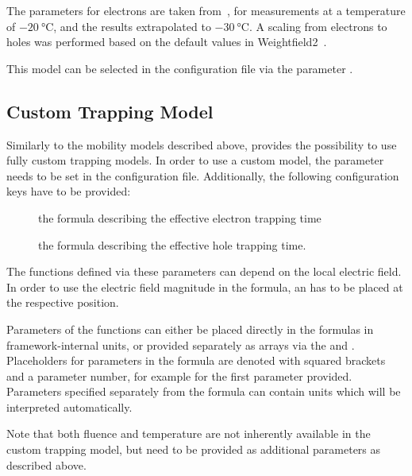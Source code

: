 The parameters for electrons are taken from~\cite{Mandic}, for measurements at a temperature of $\SI{-20}{\celsius}$, and the results extrapolated to $\SI{-30}{\celsius}$.
A scaling from electrons to holes was performed based on the default values in Weightfield2~\cite{Weightfield2}.

This model can be selected in the configuration file via the parameter .

\subsection{Custom Trapping Model}

Similarly to the mobility models described above, \apsq provides the possibility to use fully custom trapping models.
In order to use a custom model, the parameter  needs to be set in the configuration file.
Additionally, the following configuration keys have to be provided:
\begin{description}
    \item[] the formula describing the effective electron trapping time
    \item[] the formula describing the effective hole trapping time.
\end{description}

The functions defined via these parameters can depend on the local electric field.
In order to use the electric field magnitude in the formula, an  has to be placed at the respective position.

Parameters of the functions can either be placed directly in the formulas in framework-internal units, or provided separately as arrays via the  and .
Placeholders for parameters in the formula are denoted with squared brackets and a parameter number, for example \parameter{[0]} for the first parameter provided.
Parameters specified separately from the formula can contain units which will be interpreted automatically.

\begin{warning}
Note that both fluence and temperature are not inherently available in the custom trapping model, but need to be provided as additional parameters as described above.
\end{warning}

